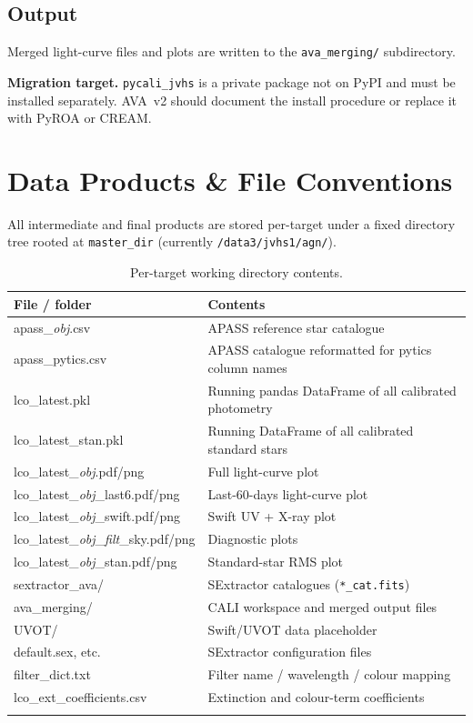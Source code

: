 \documentclass[12pt,a4paper]{article}
\begin{document}
\subsection{Output}

Merged light-curve files and plots are written to the \texttt{ava\_merging/} subdirectory.

\begin{warnbox}
\textbf{Migration target.}  \texttt{pycali\_jvhs} is a private package not on PyPI and
must be installed separately.  AVA~v2 should document the install procedure or replace
it with PyROA or CREAM.
\end{warnbox}

\section{Data Products \& File Conventions}
\label{sec:products}

All intermediate and final products are stored per-target under a fixed directory tree
rooted at \texttt{master\_dir} (currently \texttt{/data3/jvhs1/agn/}).

\begin{longtable}{>{\ttfamily}p{5.5cm}p{8.5cm}}
\toprule
File / folder & Contents \\
\midrule
apass\_\textit{obj}.csv & APASS reference star catalogue \\
apass\_pytics.csv & APASS catalogue reformatted for pytics column names \\
lco\_latest.pkl & Running pandas DataFrame of all calibrated photometry \\
lco\_latest\_stan.pkl & Running DataFrame of all calibrated standard stars \\
lco\_latest\_\textit{obj}.pdf/png & Full light-curve plot \\
lco\_latest\_\textit{obj}\_last6.pdf/png & Last-60-days light-curve plot \\
lco\_latest\_\textit{obj}\_swift.pdf/png & Swift UV + X-ray plot \\
lco\_latest\_\textit{obj}\_\textit{filt}\_sky.pdf/png & Diagnostic plots \\
lco\_latest\_\textit{obj}\_stan.pdf/png & Standard-star RMS plot \\
sextractor\_ava/ & SExtractor catalogues (\texttt{*\_cat.fits}) \\
ava\_merging/ & CALI workspace and merged output files \\
UVOT/ & Swift/UVOT data placeholder \\
default.sex, etc. & SExtractor configuration files \\
filter\_dict.txt & Filter name / wavelength / colour mapping \\
lco\_ext\_coefficients.csv & Extinction and colour-term coefficients \\
\bottomrule
\caption{Per-target working directory contents.}
\end{longtable}
\end{document}
